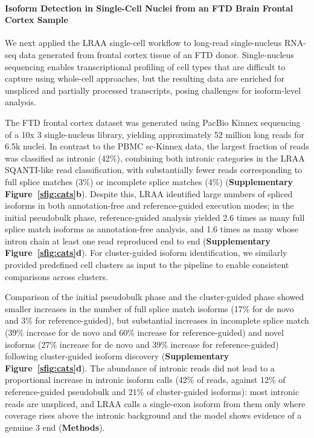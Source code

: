 \paragraph{Isoform Detection in Single-Cell Nuclei from an FTD Brain Frontal Cortex Sample}\label{isoform-detection-in-single-cell-nuclei-from-an-ftd-brain-frontal-cortex-sample}

We next applied the LRAA single-cell workflow to long-read single-nucleus RNA-seq data generated from frontal cortex tissue of an FTD donor. Single-nucleus sequencing enables transcriptional profiling of cell types that are difficult to capture using whole-cell approaches, but the resulting data are enriched for unspliced and partially processed transcripts, posing challenges for isoform-level analysis.

The FTD frontal cortex dataset was generated using PacBio Kinnex sequencing of a 10x 3\p{} single-nucleus library, yielding approximately 52 million long reads for 6.5k nuclei. In contrast to the PBMC sc-Kinnex data, the largest fraction of reads was classified as intronic (42\%), combining both intronic categories in the LRAA SQANTI-like read classification, with substantially fewer reads corresponding to full splice matches (3\%) or incomplete splice matches (4\%) (\textbf{Supplementary Figure~\ref{sfig:cats}b}). Despite this, LRAA identified large numbers of spliced isoforms in both annotation-free and reference-guided execution modes; in the initial pseudobulk phase, reference-guided analysis yielded 2.6 times as many full splice match isoforms as annotation-free analysis, and 1.6 times as many whose intron chain at least one read reproduced end to end (\textbf{Supplementary Figure~\ref{sfig:cats}d}). For cluster-guided isoform identification, we similarly provided predefined cell clusters as input to the pipeline to enable consistent comparisons across clusters.

Comparison of the initial pseudobulk phase and the cluster-guided phase showed smaller increases in the number of full splice match isoforms (17\% for de novo and 3\% for reference-guided), but substantial increases in incomplete splice match (39\% increase for de novo and 60\% increase for reference-guided) and novel isoforms (27\% increase for de novo and 39\% increase for reference-guided) following cluster-guided isoform discovery (\textbf{Supplementary Figure~\ref{sfig:cats}d}). The abundance of intronic reads did not lead to a proportional increase in intronic isoform calls (42\% of reads, against 12\% of reference-guided pseudobulk and 21\% of cluster-guided isoforms): most intronic reads are unspliced, and LRAA calls a single-exon isoform from them only where coverage rises above the intronic background and the model shows evidence of a genuine 3\p{} end (\textbf{Methods}).

